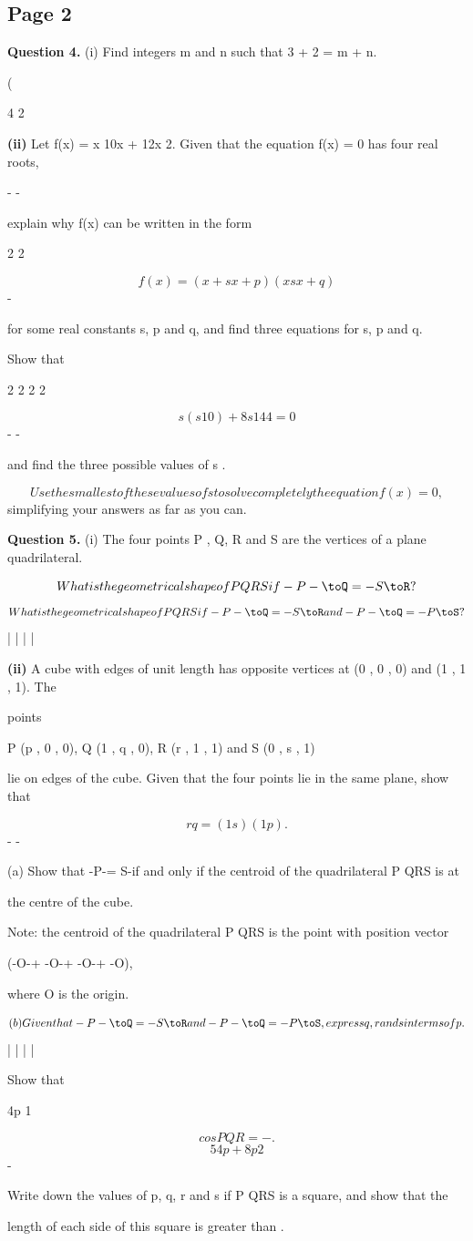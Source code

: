 \documentclass[12pt]{article}
\begin{document}
\subsection*{Page 2}
\begin{flushleft}
\bigskip\textbf{Question 4.} (i) Find integers m and n such that 3 + 2 = m + n.\par
(\par
4 2\par
\textbf{(ii)} Let f(x) = x 10x + 12x 2. Given that the equation f(x) = 0 has four real roots,\par
- -\par
explain why f(x) can be written in the form\par
2 2\par
\[f(x) = (x + sx + p)(x sx + q)\]
-\par
for some real constants s, p and q, and find three equations for s, p and q.\par
Show that\par
2 2 2 2\par
\[s (s 10) + 8s 144 = 0\]
- -\par
and find the three possible values of s .\par
\[Use the smallest of these values of s to solve completely the equation f(x) = 0 ,\]
simplifying your answers as far as you can.\par
\bigskip\textbf{Question 5.} (i) The four points P , Q, R and S are the vertices of a plane quadrilateral.\par
\[What is the geometrical shape of P QRS if -P-\toQ = -S\toR ?\]
\[What is the geometrical shape of P QRS if -P-\toQ = -S\toR and -P-\toQ = -P\toS ?\]
| | | |\par
\textbf{(ii)} A cube with edges of unit length has opposite vertices at (0 , 0 , 0) and (1 , 1 , 1). The\par
points\par
P (p , 0 , 0), Q (1 , q , 0), R (r , 1 , 1) and S (0 , s , 1)\par
lie on edges of the cube. Given that the four points lie in the same plane, show that\par
\[rq = (1 s)(1 p).\]
- -\par
(a) Show that -P-\toQ = S-\toR if and only if the centroid of the quadrilateral P QRS is at\par
the centre of the cube.\par
Note: the centroid of the quadrilateral P QRS is the point with position vector\par
(-O-\toP + -O-\toQ + -O-\toR + -O\toS),\par
where O is the origin.\par
\[(b) Given that -P-\toQ = -S\toR and -P-\toQ = -P\toS , express q, r and s in terms of p.\]
| | | |\par
Show that\par
4p 1\par
\[cos P QR = - .\]
\[5 4p + 8p2\]
-\par
Write down the values of p, q, r and s if P QRS is a square, and show that the\par
length of each side of this square is greater than .\par
\end{flushleft}
\end{document}
